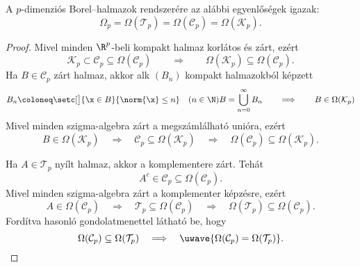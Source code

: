\documentclass[
]{elteikthesis}[2024/04/26]
\begin{document}
	\begin{statement}{}{}
		A \( p \)-dimenziós Borel--halmazok rendszerére az alábbi egyenlőségek igazak:
		\[
			\Omega_p = 
			\Omega( \mathcal{T}_p ) = 
			\Omega( \mathcal{C}_p ) = 
			\Omega( \mathcal{K}_p ).
		\]
	\end{statement}
	\begin{proof}
		Mivel minden \( \R^p \)-beli kompakt halmaz korlátos és zárt, ezért
		\[
			\mathcal{K}_p \subset \mathcal{C}_p \subseteq \Omega( \mathcal{C}_p )
			\qquad \Longrightarrow \qquad
			\Omega( \mathcal{K}_p ) \subseteq \Omega( \mathcal{C}_p ).
		\]
		Ha \( B \in \mathcal{C}_p \) zárt halmaz, 
		akkor alk \( (B_n) \) kompakt halmazokból képzett
		\[
			B_n \coloneq \setc[\big]{ \x \in B }{ \norm{\x} \leq n } \quad (n \in \N)
			B = \bigcup_{n=0}^{\infty} B_n
			\qquad \Longrightarrow \qquad
			B \in \Omega( \mathcal{K}_p )
		\]
		Mivel minden szigma-algebra zárt a megszámlálható unióra, ezért
		\[
			B \in \Omega( \mathcal{K}_p )
			\quad \Longrightarrow \quad
			\mathcal{C}_p \subseteq \Omega( \mathcal{K}_p )
			\quad \Longrightarrow \quad
			\Omega( \mathcal{C}_p ) \subseteq \Omega( \mathcal{K}_p ).
		\]
		
		Ha \( A \in \mathcal{T}_p \) nyílt halmaz, akkor a komplementere zárt.
		Tehát
		\[
			A^c \in \mathcal{C}_p \subseteq \Omega( \mathcal{C}_p ).
		\]
		Mivel minden szigma-algebra zárt a komplementer képzésre, ezért
		\[
			A \in \Omega( \mathcal{C}_p )
			\quad \Longrightarrow \quad
			\mathcal{T}_p \subseteq \Omega( \mathcal{C}_p )
			\quad \Longrightarrow \quad
			\Omega( \mathcal{T}_p ) \subseteq \Omega( \mathcal{C}_p ).
		\]
		Fordítva hasonló gondolatmenettel
		látható be, hogy
		\[
			\Omega( \mathcal{C}_p ) \subseteq \Omega( \mathcal{T}_p )
			\quad \Longrightarrow \quad
			\smash{\uwave{\Omega( \mathcal{C}_p ) = \Omega( \mathcal{T}_p )}}.
		\]
	\end{proof}
	
\end{document}
